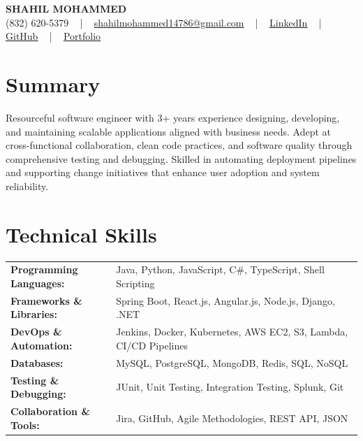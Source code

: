 \documentclass[letterpaper,11pt]{article}
\begin{document}
\begin{center}
    {\fontsize{14pt}{12pt}\selectfont \textbf{\MakeUppercase{Shahil Mohammed}}}\\ \vspace{2pt}
    \fontsize{10pt}{12pt}\selectfont (832) 620-5379 ~ | ~ \href{mailto:shahilmohammed14786@gmail.com}{shahilmohammed14786@gmail.com} ~ | ~  
    \href{https://www.linkedin.com/in/shahil-mohammed-9652931a1/}{\color{blue}\underline{LinkedIn}}  ~ | ~ 
    \href{https://github.com/freakbeast14}{\color{blue}\underline{GitHub}} ~ | ~ 
    \href{https://shahil-mohammed.netlify.app/}{\color{blue}\underline{Portfolio}}
    \vspace{-8pt}
\end{center}

\section{Summary}
\fontsize{9pt}{10pt}\selectfont
Resourceful software engineer with 3+ years experience designing, developing, and maintaining scalable applications aligned with business needs. Adept at cross-functional collaboration, clean code practices, and software quality through comprehensive testing and debugging. Skilled in automating deployment pipelines and supporting change initiatives that enhance user adoption and system reliability.
 \vspace{-5pt}
 
\section{Technical Skills}
        \vspace{-14pt}
        \begin{table}[h]
            \fontsize{9pt}{10pt}\selectfont
            \begin{tabular}{p{0.3\linewidth} p{0.7\linewidth}}
                \textbf{Programming Languages:} & Java, Python, JavaScript, C\#, TypeScript, Shell Scripting \\
                \textbf{Frameworks \& Libraries:} & Spring Boot, React.js, Angular.js, Node.js, Django, .NET \\
                \textbf{DevOps \& Automation:} & Jenkins, Docker, Kubernetes, AWS EC2, S3, Lambda, CI/CD Pipelines \\
                \textbf{Databases:} & MySQL, PostgreSQL, MongoDB, Redis, SQL, NoSQL \\
                \textbf{Testing \& Debugging:} & JUnit, Unit Testing, Integration Testing, Splunk, Git \\
                \textbf{Collaboration \& Tools:} & Jira, GitHub, Agile Methodologies, REST API, JSON \\
            \end{tabular}
        \end{table}
 \vspace{-15pt}
 
\end{document}
